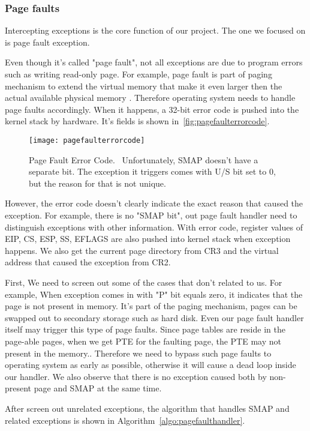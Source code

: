 \subsubsection{Page faults}
Intercepting exceptions is the core function of our project. The one we focused on is page fault exception.

Even though it's called "page fault", not all exceptions are due to program errors such as writing read-only page. For example, page fault is part of paging mechanism to extend the virtual memory that make it even larger then the actual available physical memory . Therefore operating system needs to handle page faults accordingly. When it happens, a 32-bit error code is pushed into the kernel stack by hardware. It's fields is shown in~\autoref{fig:pagefaulterrorcode}.


\begin{figure}[th]
  \texttt{[image: pagefaulterrorcode]}
  \centering
  \caption{Page Fault Error Code.~\cite{intelinterrupt} Unfortunately, SMAP doesn't have a separate bit. The exception it triggers comes with U/S bit set to 0, but the reason for that is not unique.}
  \label{fig:pagefaulterrorcode}
\end{figure}

However, the error code doesn't clearly indicate the exact reason that caused the exception. For example, there is no "SMAP bit", out page fault handler need to distinguish exceptions with other information. With error code, register values of EIP, CS, ESP, SS, EFLAGS are also pushed into kernel stack when exception happens. We also get the current page directory from CR3 and the virtual address that caused the exception from CR2.

First, We need to screen out some of the cases that don't related to us. For example, When exception comes in with "P" bit equals zero, it indicates that the page is not present in memory. It's part of the paging mechanism, pages can be swapped out to secondary storage such as hard disk. Even our page fault handler itself may trigger this type of page faults. Since page tables are reside in the page-able pages, when we get PTE for the faulting page, the PTE may not present in the memory.. Therefore we need to bypass such page faults to operating system as early as possible, otherwise it will cause a dead loop inside our handler. We also observe that there is no exception caused both by non-present page and SMAP at the same time.


After screen out unrelated exceptions, the algorithm that handles SMAP and related exceptions is shown in Algorithm~\ref{algo:pagefaulthandler}.


